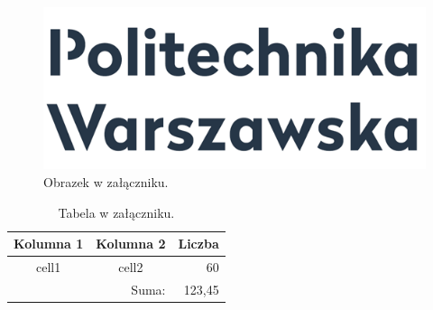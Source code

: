 \documentclass[
    bindingoffset=5mm,  %
    footnoteindent=3mm, %
    hyphenation=true    %
]{src/wut-thesis}
\begin{document}
\pagestyle{plain}

\listoffigurestoc    %
\vspace{1cm}         %
\listoftablestoc     %
\vspace{1cm}         %
\listofappendicestoc %


\captionsetup[figure]{list=no}
\captionsetup[table]{list=no}

\clearpage
{}
\lipsum[1-3]
\begin{figure}[!h]
	\centering \includegraphics[width=0.5\linewidth]{logopw2.png}
	\caption{Obrazek w załączniku.}
\end{figure}
\lipsum[4-7]

\clearpage
{}
\lipsum[1-2]
\begin{table}[!h] \centering
    \caption{Tabela w załączniku.}
    \begin{tabular} {| c | c | r |} \hline
        Kolumna 1       & Kolumna 2 & Liczba \\ \hline\hline
        cell1           & cell2     & 60     \\ \hline
        \multicolumn{2}{|r|}{Suma:} & 123,45 \\ \hline
    \end{tabular}
\end{table}
\lipsum[3-4]

\end{document}
